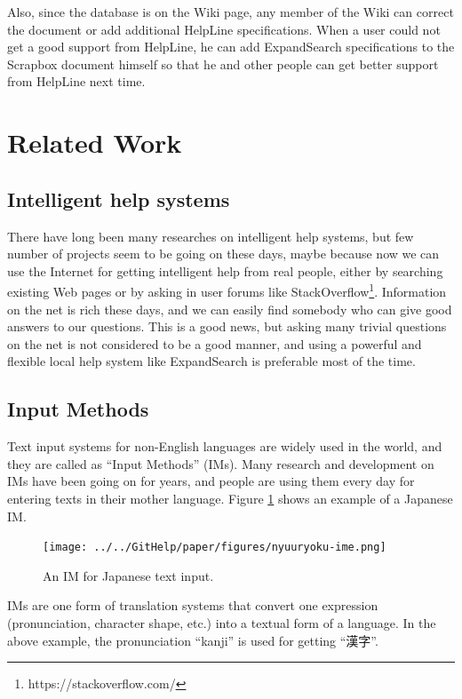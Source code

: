 \documentclass[manuscript,anonymous,review]{acmart}
\def\HL{\textsf{HelpLine}}
\def\ES{\textsf{ExpandSearch}}
\def\SB{\textsf{Scrapbox}}
\begin{document}
Also, since the database is on the Wiki page, any member of the
Wiki can correct the document or add additional {\HL} specifications.
When a user could not get a good support from {\HL}, he can add
{\ES} specifications to the {\SB} document himself
so that he and other people can get better support
from {\HL} next time.

\section{Related Work}

\subsection{Intelligent help systems}

There have long been many researches on
intelligent help systems\cite{Delisle:2002:UIH:606412.606415},
but few number of projects seem to be going on these days,
maybe because now we can use the Internet for getting intelligent help from
real people,
either by searching existing Web pages or 
by asking in user forums like StackOverflow\footnote{
  \textsf{https://stackoverflow.com/}
}.
Information on the net is rich these days, and we can easily
find somebody who can give good answers to our questions.
This is a good news, but 
asking many trivial questions on the net is not considered to be a
good manner, and
using a powerful and flexible local help system like {\ES} is
preferable most of the time.

\subsection{Input Methods}

Text input systems for non-English languages are widely used
in the world,
and they are called as ``Input Methods'' (IMs).
%
Many research and development on IMs have been going on for years, and
people are using them every day for entering texts in their mother language.
Figure \ref{gyaim} shows an example of a Japanese IM.

\begin{figure}[H]
  \centerline{\texttt{[image: ../../GitHelp/paper/figures/nyuuryoku-ime.png]}}
  \caption{An IM for Japanese text input.}
  \label{gyaim}
\end{figure}

IMs are one form of translation systems that convert one
expression (pronunciation, character shape, etc.)
into a textual form of a language.
In the above example, the pronunciation ``kanji''
is used for getting ``漢字''.
\end{document}
